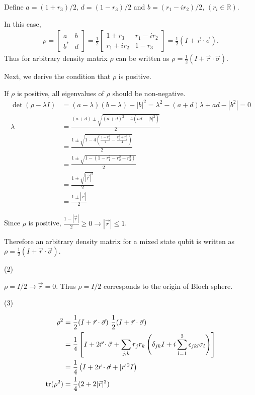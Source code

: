 Define $a = (1+r_3)/2$, $d = (1-r_3)/2$ and $b = (r_1 - ir_2)/2$, $(r_i \in \mathds{R})$.

In this case,
\begin{align*}
    \rho = \begin{bmatrix}
        a & b \\ b^* & d
    \end{bmatrix}
    =
    \frac{1}{2} \begin{bmatrix}
        1+r_3 & r_1 - ir_2 \\
        r_1 + ir_2 & 1 - r_3
    \end{bmatrix}
    =
    \frac{1}{2} (I + \vec{r} \cdot \vec{\sigma}).
\end{align*}
Thus for arbitrary density matrix $\rho$ can be written as $\rho = \frac{1}{2} (I + \vec{r} \cdot \vec{\sigma})$.

Next, we derive the condition that $\rho$ is positive.

If $\rho$ is positive, all eigenvalues of $\rho$ should be non-negative.
\begin{align*}
    \det (\rho - \lambda I) &= (a-  \lambda) (b - \lambda) - |b|^2 = \lambda^2 - (a+d)\lambda + ad - |b^2| = 0\\
    \lambda &= \frac{(a+d) \pm \sqrt{(a+d)^2 - 4 (ad - |b|^2)}}{2}\\
        &= \frac{1 \pm \sqrt{1 - 4 \left(\frac{1 - r_3^2}{4} - \frac{r_1^2 + r_2^2}{4} \right)}}{2}\\
        &= \frac{1 \pm \sqrt{1 - (1 - r_1^2 - r_2^2 - r_3^2)}}{2}\\
        &= \frac{1 \pm \sqrt{|\vec{r}|^2}}{2}\\
        &= \frac{1 \pm |\vec{r}|}{2}
\end{align*}

Since $\rho$ is positive, $\frac{1 - |\vec{r}|}{2} \geq 0 \rightarrow |\vec{r}| \leq 1$.

Therefore an arbitrary density matrix for a mixed state qubit is written as $\rho = \frac{1}{2} (I + \vec{r} \cdot \vec{\sigma})$.

\vspace{5mm}
(2)

$\rho = I / 2 \rightarrow \vec{r}  = 0$. Thus  $\rho = I / 2$ corresponds to the origin of Bloch sphere.

\vspace{5mm}
(3)

\begin{align*}
    \rho^2 &= \frac{1}{2} (I + \vec{r} \cdot \vec{\sigma})~ \frac{1}{2} (I + \vec{r} \cdot \vec{\sigma})\\
        &= \frac{1}{4} \left[ I + 2 \vec{r}\cdot \vec{\sigma} + \sum_{j,k}r_j r_k \left(\delta_{jk} I + i \sum_{l=1}^3 \epsilon_{jkl}\sigma_l \right)  \right]\\
        &= \frac{1}{4} \left(I + 2 \vec{r}\cdot \vec{\sigma} + |\vec{r}|^2 I \right)\\
    \operatorname{tr} (\rho^2) &= \frac{1}{4} (2 + 2|\vec{r}|^2)
\end{align*}

